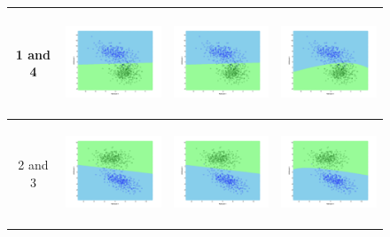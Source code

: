 \documentclass[a4paper]{article}
\begin{document}
\begin{figure}
\begin{tabular}{|c|c|c|c|}
				\hline
				1 and
				4&\includegraphics[width=40mm,height=30mm]{bayes/over/pair/14/all_cov.png}&\includegraphics[width=40mm,height=30mm]{bayes/over/pair/14/avg_cov.png}
				&\includegraphics[width=40mm,height=30mm]{bayes/over/pair/14/diff_cov.png}\\
				\hline
				2 and
				3&\includegraphics[width=40mm,height=30mm]{bayes/over/pair/23/all_cov.png}&\includegraphics[width=40mm,height=30mm]{bayes/over/pair/23/avg_cov.png}
				&\includegraphics[width=40mm,height=30mm]{bayes/over/pair/23/diff_cov.png}\\

\end{tabular}
\end{figure}
\end{document}
